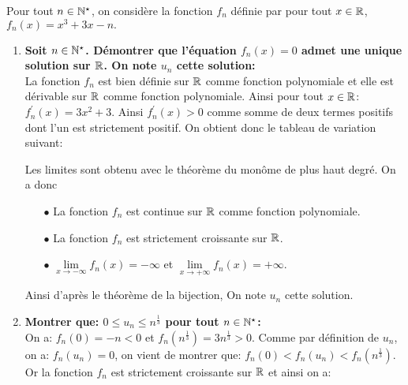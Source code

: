 \documentclass[a4paper, 11pt,reqno]{article}
\begin{document}
\begin{correction}  \;
	Pour tout $n\in\mathbb{N}^{\star}$, on consid\`{e}re la fonction $f_n$ d\'efinie par pour tout $x\in\mathbb{R}$, $f_n(x)=x^3+3x-n.$
	\begin{enumerate}
		\item \textbf{Soit $n\in\mathbb{N}^{\star}$. D\'emontrer que l'\'equation $f_n(x)=0$ admet une unique solution sur $\mathbb{R}$. On note $u_n$ cette solution:}\\
		      \noindent La fonction $f_n$ est bien d\'efinie sur $\mathbb{R}$ comme fonction polynomiale et elle est d\'erivable sur $\mathbb{R}$ comme fonction polynomiale. Ainsi pour tout $x\in\mathbb{R}$: $f^{\prime}_n(x)=3x^2+3$. Ainsi $f_n^{\prime}(x)>0$ comme somme de deux termes positifs dont l'un est strictement positif. On obtient donc le tableau de variation suivant:
		      \begin{center}
		      \end{center}
		      Les limites sont obtenu avec le th\'eor\`{e}me du mon\^{o}me de plus haut degr\'e. On a donc
		      \begin{itemize}
			      \item[$\bullet$] La fonction $f_n$ est continue sur $\mathbb{R}$ comme fonction polynomiale.
			      \item[$\bullet$] La fonction $f_n$ est strictement croissante sur $\mathbb{R}$.
			      \item[$\bullet$] $\lim\limits_{x\to -\infty} f_n(x)=-\infty$ et $\lim\limits_{x\to +\infty} f_n(x)=+\infty$.
		      \end{itemize}
		      Ainsi d'apr\`{e}s le th\'eor\`{e}me de la bijection,  On note $u_n$ cette solution.
		\item  \textbf{Montrer que: $0\leq u_n\leq n^{\frac{1}{3}}$ pour tout $n\in\mathbb{N}^{\star}$:}\\
		      \noindent On a: $f_n(0)=-n<0$ et $f_n(n^{\frac{1}{3}})=3n^{\frac{1}{3}}>0$. Comme par d\'efinition de $u_n$, on a: $f_n(u_n)=0$, on vient de montrer que: $f_n(0)<f_n(u_n)<f_n(n^{\frac{1}{3}})$. Or la fonction $f_n$ est strictement croissante sur $\mathbb{R}$ et ainsi on a:

\end{enumerate}
\end{correction}
\end{document}
